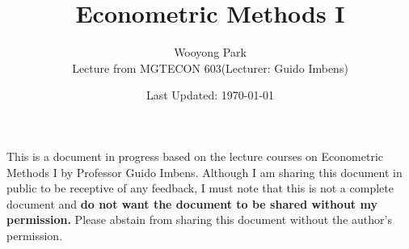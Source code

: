 \documentclass{article}
\title{Econometric Methods I}
\author{Wooyong Park\\ Lecture from MGTECON 603(Lecturer: Guido Imbens)}
\date{Last Updated: \today}
\numberwithin{equation}{subsection}
\begin{document}
\setcounter{page}{1}

\maketitle

{

This is a document in progress based on the lecture courses on Econometric Methods I by Professor Guido Imbens.
Although I am sharing this document in public to be receptive of any feedback, I must note that this is not a complete document and \textbf{do not want the document to be shared without my permission.}
Please abstain from sharing this document without the author's permission.
}



\tableofcontents

\newpage
{}
\setcounter{page}{1}


% 

% 

% 

% 




\newpage
\printbibliography

\newpage
\appendix


\end{document}
